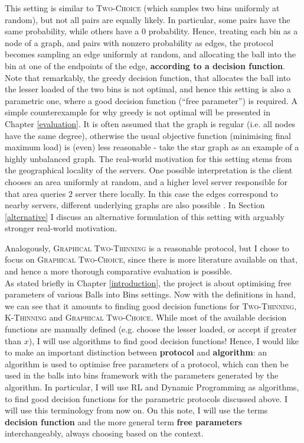 This setting is similar to \textsc{Two-Choice} (which samples two bins uniformly at random), but not all pairs are equally likely. In particular, some pairs have the same probability, while others have a $0$ probability. Hence, treating each bin as a node of a graph, and pairs with nonzero probability as edges, the protocol becomes sampling an edge uniformly at random, and allocating the ball into the bin at one of the endpoints of the edge, \textbf{according to a decision function}. Note that remarkably, the greedy decision function, that allocates the ball into the lesser loaded of the two bins is not optimal, and hence this setting is also a parametric one, where a good decision function (``free parameter'') is required. A simple counterexample for why greedy is not optimal will be presented in Chapter \ref{evaluation}. It is often assumed that the graph is regular (i.e. all nodes have the same degree), otherwise the usual objective function (minimising final maximum load) is (even) less reasonable - take the star graph as an example of a highly unbalanced graph. The real-world motivation for this setting stems from the geographical locality of the servers. One possible interpretation is the client chooses an area uniformly at random, and a higher level server responsible for that area queries $2$ server there locally. In this case the edges correspond to nearby servers, different underlying graphs are also possible \cite{peres2015oneplusbeta}. In Section \ref{alternative} I discuss an alternative formulation of this setting with arguably stronger real-world motivation.

Analogously, \textsc{Graphical Two-Thinning} is a reasonable protocol, but I chose to focus on \textsc{Graphical Two-Choice}, since there is more literature available on that, and hence a more thorough comparative evaluation is possible.\\


As stated briefly in Chapter \ref{introduction}, the project is about optimising free parameters of various Balls into Bins settings. Now with the definitions in hand, we can see that it amounts to finding good decision functions for \textsc{Two-Thinning}, \textsc{K-Thinning} and \textsc{Graphical Two-Choice}. While most of the available decision functions are manually defined (e.g. choose the lesser loaded, or accept if greater than $x$), I will use algorithms to find good decision functions! Hence, I would like to make an important distinction between \textbf{protocol} and \textbf{algorithm}: an algorithm is used to optimise free parameters of a protocol, which can then be used in the balls into bins framework with the parameters generated by the algorithm. In particular, I will use RL and Dynamic Programming as algorithms, to find good decision functions for the parametric protocols discussed above. I will use this terminology from now on. On this note, I will use the terms \textbf{decision function} and the more general term \textbf{free parameters} interchangeably, always choosing based on the context. 


